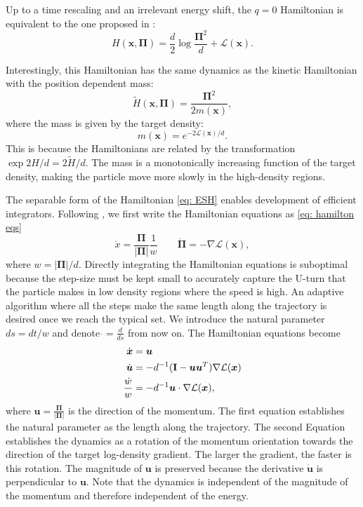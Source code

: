 \documentclass[twoside,11pt]{article}
\newcommand{\p}{\boldsymbol{\Pi}}
\newcommand{\x}{\boldsymbol{x}}
\newcommand{\U}{\boldsymbol{u}}
\begin{document}
Up to a time rescaling and an irrelevant energy shift, the $q = 0$ Hamiltonian is equivalent to the one proposed in \cite{ESH}:
\begin{equation} \label{eq: ESH}
    H(\x, \p) = \frac{d}{2} \log \frac{\p^2}{d} + \mathcal{L}(\x).
\end{equation}

Interestingly, this Hamiltonian has the same dynamics as the kinetic Hamiltonian with the position dependent mass:
\begin{equation} \label{eq: H1}
    \widetilde{H}(\x, \p) = \frac{\p^2}{2 m(\x)},
\end{equation}
where the mass is given by the target density:
\begin{equation}\label{eq: tuning1}
    m(\x) = e^{- 2 \mathcal{L}(\x)/d}. %
\end{equation}
This is because the Hamiltonians are related by the transformation $\exp{ 2 H / d} = 2 \widetilde{H} / d$.
The mass is a monotonically increasing function of the target density, making the particle move more slowly in the high-density regions.

The separable form of the Hamiltonian \eqref{eq: ESH} enables development of efficient integrators. Following \citet{ESH}, we first write the Hamiltonian equations as \eqref{eq: hamilton eqs}
\begin{equation} \label{eq: EOM}
    \dot{x} = \frac{\p}{\vert \p \vert} \frac{1}{w} \qquad
    \dot{\p} = - \nabla \mathcal{L}(\x),
\end{equation}
where $w = \vert \p \vert / d$. Directly integrating the Hamiltonian equations is suboptimal because the step-size must be kept small to accurately capture the U-turn that the particle makes in low density regions where the speed is high. An adaptive algorithm where all the steps make the same length along the trajectory is desired once we reach the typical set. We introduce the natural parameter $d s = d t / w$ and denote $\dot{} = \frac{d}{d s}$ from now on. The Hamiltonian equations become
\begin{align} \label{eq: rescaled EOM}
    \dot{\x} &= \U\\ \nonumber
    \dot{\U} &= - d^{-1}({\bf I} - \U \U^T) \nabla \mathcal{L}(\x)\\ \nonumber
    \frac{\dot{w}}{w} &= - d^{-1}\U \cdot \nabla \mathcal{L}(\x),
\end{align}
where $\U = \frac{\p}{\vert \p \vert}$ is the direction of the momentum. The first equation establishes the natural parameter as the length along the trajectory. The second Equation establishes the dynamics as a rotation of the momentum orientation towards the direction of the target log-density gradient. The larger the gradient, the faster is this rotation. The magnitude of $\U$ is preserved because the derivative $\dot{\U}$ is perpendicular to $\U$. Note that the dynamics is independent of the magnitude of the momentum and therefore independent of the energy.
\end{document}
